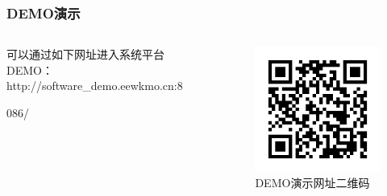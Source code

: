 \documentclass[aspectratio=169, 10pt, utf8, mathserif]{beamer}
\begin{document}
		\begin{frame}
	\frametitle{DEMO演示}
	
	\begin{columns}
		
		\begin{column}{.4\linewidth}
			可以通过如下网址进入系统平台DEMO：http://software\_demo.eewkmo.cn:8
			
			086/
		\end{column}
		
		\begin{column}{.6\linewidth}
			\begin{figure}[H]
				\centering
				\includegraphics[width=0.75\linewidth]{pic/screenshot035}
				\caption{DEMO演示网址二维码}
				\label{fig:screenshot035}
			\end{figure}
			
		\end{column}
	\end{columns}
\end{frame}




\begin{frame}
\end{frame}
\end{document}
